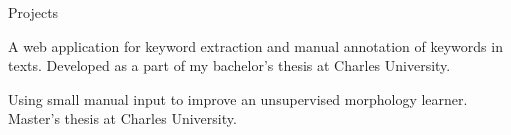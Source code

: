 \begin{rubric}{Projects}

A web application for keyword extraction and manual annotation of keywords in texts. Developed as a part of my bachelor's thesis at Charles University.

Using small manual input to improve an unsupervised morphology learner. Master's thesis at Charles University.

\end{rubric}
